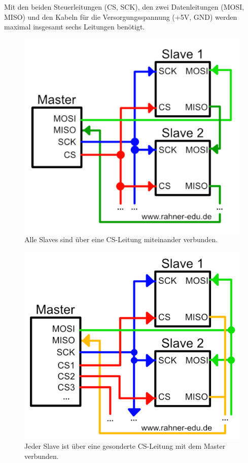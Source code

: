 Mit den beiden Steuerleitungen (CS, SCK), den zwei Datenleitungen (MOSI, MISO) und den Kabeln für die Versorgungsspannung (+5V, GND) werden maximal insgesamt sechs Leitungen benötigt.

\begin{figure}[H]
	\begin{center}
		\includegraphics[scale=0.45]{figures/hcis/spi_anschluss_1.png}
		\caption{Alle Slaves sind über eine CS-Leitung miteinander verbunden.}
		\label{abb:SPI_Anschluss_1}
	\end{center}
\end{figure}

\begin{figure}[H]
	\begin{center}	
		\includegraphics[scale=0.35]{figures/hcis/spi_anschluss_2.png}
		\caption{ Jeder Slave ist über eine gesonderte CS-Leitung mit dem Master verbunden.}
		\label{abb:SPI_Anschluss_2}
	\end{center}
\end{figure}

